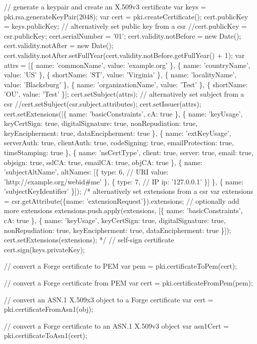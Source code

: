 \begin{DoxyCode}
// generate a keypair and create an X.509v3 certificate
var keys = pki.rsa.generateKeyPair(2048);
var cert = pki.createCertificate();
cert.publicKey = keys.publicKey;
// alternatively set public key from a csr
//cert.publicKey = csr.publicKey;
cert.serialNumber = '01';
cert.validity.notBefore = new Date();
cert.validity.notAfter = new Date();
cert.validity.notAfter.setFullYear(cert.validity.notBefore.getFullYear() + 1);
var attrs = [\{
  name: 'commonName',
  value: 'example.org'
\}, \{
  name: 'countryName',
  value: 'US'
\}, \{
  shortName: 'ST',
  value: 'Virginia'
\}, \{
  name: 'localityName',
  value: 'Blacksburg'
\}, \{
  name: 'organizationName',
  value: 'Test'
\}, \{
  shortName: 'OU',
  value: 'Test'
\}];
cert.setSubject(attrs);
// alternatively set subject from a csr
//cert.setSubject(csr.subject.attributes);
cert.setIssuer(attrs);
cert.setExtensions([\{
  name: 'basicConstraints',
  cA: true
\}, \{
  name: 'keyUsage',
  keyCertSign: true,
  digitalSignature: true,
  nonRepudiation: true,
  keyEncipherment: true,
  dataEncipherment: true
\}, \{
  name: 'extKeyUsage',
  serverAuth: true,
  clientAuth: true,
  codeSigning: true,
  emailProtection: true,
  timeStamping: true
\}, \{
  name: 'nsCertType',
  client: true,
  server: true,
  email: true,
  objsign: true,
  sslCA: true,
  emailCA: true,
  objCA: true
\}, \{
  name: 'subjectAltName',
  altNames: [\{
    type: 6, // URI
    value: 'http://example.org/webid#me'
  \}, \{
    type: 7, // IP
    ip: '127.0.0.1'
  \}]
\}, \{
  name: 'subjectKeyIdentifier'
\}]);
/* alternatively set extensions from a csr
var extensions = csr.getAttribute(\{name: 'extensionRequest'\}).extensions;
// optionally add more extensions
extensions.push.apply(extensions, [\{
  name: 'basicConstraints',
  cA: true
\}, \{
  name: 'keyUsage',
  keyCertSign: true,
  digitalSignature: true,
  nonRepudiation: true,
  keyEncipherment: true,
  dataEncipherment: true
\}]);
cert.setExtensions(extensions);
*/
// self-sign certificate
cert.sign(keys.privateKey);

// convert a Forge certificate to PEM
var pem = pki.certificateToPem(cert);

// convert a Forge certificate from PEM
var cert = pki.certificateFromPem(pem);

// convert an ASN.1 X.509x3 object to a Forge certificate
var cert = pki.certificateFromAsn1(obj);

// convert a Forge certificate to an ASN.1 X.509v3 object
var asn1Cert = pki.certificateToAsn1(cert);
\end{DoxyCode}


